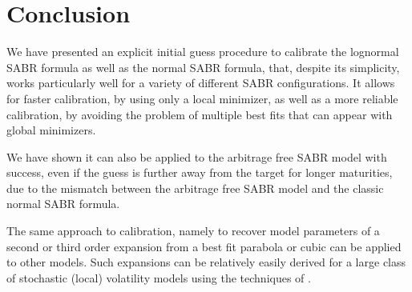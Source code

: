 \documentclass[]{rAMF2e}
\begin{document}
\section{Conclusion}
We have presented an explicit initial guess procedure to calibrate the lognormal SABR formula as well as the normal SABR formula, that, despite its simplicity, works particularly well for a variety of different SABR configurations. It allows for faster calibration, by using only a local minimizer, as well as a more reliable calibration, by avoiding the problem of multiple best fits that can appear with global minimizers. 

We have shown it can also be applied to the arbitrage free SABR model with success, even if the guess is further away from the target for longer maturities, due to the mismatch between the arbitrage free SABR model and the classic normal SABR formula.

The same approach to calibration, namely to recover model parameters of a second or third order expansion from a best fit parabola or cubic can be applied to other models. Such expansions can be relatively easily derived for a large class of stochastic (local) volatility models using the techniques of \citep{lorig2014implied}.
\newpage
\appendix
\end{document}

